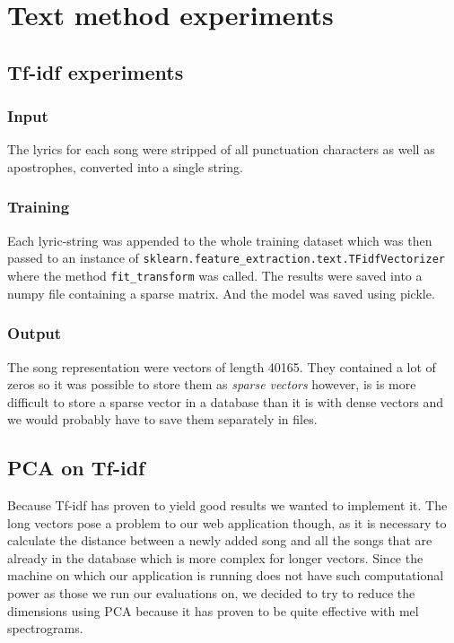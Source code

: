 \section{Text method experiments}

\subsection{Tf-idf experiments}\label{ssec:TF_idf}

\subsubsection{Input}
The lyrics for each song were stripped of all punctuation characters as well as apostrophes, converted into a single string. 
\subsubsection{Training}
Each lyric-string was appended to the whole training dataset which was then passed to an instance of \texttt{sklearn.feature\_extraction.text.TFidfVectorizer} where the method \texttt{fit\_transform} was called. The results were saved into a numpy file containing a sparse matrix. And the model was saved using pickle. \\

\subsubsection{Output}
The song representation were vectors of length 40165. They contained a lot of zeros so it was possible to store them as \textit{sparse vectors} however, is is more difficult to store a sparse vector in a database than it is with dense vectors and we would probably have to save them separately in files.

\subsection{PCA on Tf-idf}\label{ssec:PCA_on_tf_idf}

Because Tf-idf has proven to yield good results we wanted to implement it. The long vectors pose a problem to our web application though, as it is necessary to calculate the distance between a newly added song and all the songs that are already in the database which is more complex for longer vectors. Since the machine on which our application is running does not have such computational power as those we run our evaluations on, we decided to try to reduce the dimensions using PCA because it has proven to be quite effective with mel spectrograms.

